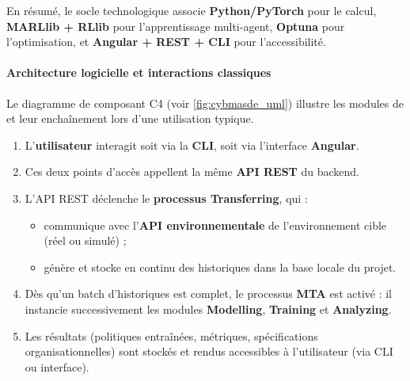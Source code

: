 \medskip
\noindent
En résumé, le socle technologique associe \textbf{Python/PyTorch} pour le calcul, \textbf{MARLlib + RLlib} pour l’apprentissage multi-agent, \textbf{Optuna} pour l’optimisation, et \textbf{Angular + REST + CLI} pour l’accessibilité.

\paragraph{Architecture logicielle et interactions classiques}

Le diagramme de composant C4 (voir \autoref{fig:cybmasde_uml}) illustre les modules de  et leur enchaînement lors d’une utilisation typique.

\begin{enumerate}
  \item L’\textbf{utilisateur} interagit soit via la \textbf{CLI}, soit via l’interface \textbf{Angular}.
  \item Ces deux points d’accès appellent la même \textbf{API REST} du backend.
  \item L’API REST déclenche le \textbf{processus Transferring}, qui :
        \begin{itemize}
          \item communique avec l’\textbf{API environnementale} de l’environnement cible (réel ou simulé) ;
          \item génère et stocke en continu des historiques dans la base locale du projet.
        \end{itemize}
  \item Dès qu’un batch d’historiques est complet, le processus \textbf{MTA} est activé : il instancie successivement les modules \textbf{Modelling}, \textbf{Training} et \textbf{Analyzing}.
  \item Les résultats (politiques entraînées, métriques, spécifications organisationnelles) sont stockés et rendus accessibles à l’utilisateur (via CLI ou interface).
\end{enumerate}

